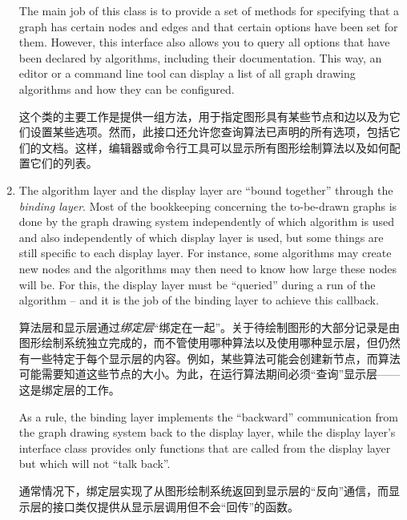 \begin{enumerate}
        The main job of this class is to provide a set of methods for
        specifying that a graph has certain nodes and edges and that certain
        options have been set for them. However, this interface also allows you
        to query all options that have been declared by algorithms, including
        their documentation. This way, an editor or a command line tool can
        display a list of all graph drawing algorithms and how they can be
        configured.


        这个类的主要工作是提供一组方法，用于指定图形具有某些节点和边以及为它们设置某些选项。然而，此接口还允许您查询算法已声明的所有选项，包括它们的文档。这样，编辑器或命令行工具可以显示所有图形绘制算法以及如何配置它们的列表。




    \item The algorithm layer and the display layer are ``bound together''
        through the \emph{binding layer}. Most of the bookkeeping concerning
        the to-be-drawn graphs is done by the graph drawing system
        independently of which algorithm is used and also independently of
        which display layer is used, but some things are still specific to each
        display layer. For instance, some algorithms may create new nodes and
        the algorithms may then need to know how large these nodes will be. For
        this, the display layer must be ``queried'' during a run of the
        algorithm -- and it is the job of the binding layer to achieve this
        callback.

        算法层和显示层通过\emph{绑定层}“绑定在一起”。关于待绘制图形的大部分记录是由图形绘制系统独立完成的，而不管使用哪种算法以及使用哪种显示层，但仍然有一些特定于每个显示层的内容。例如，某些算法可能会创建新节点，而算法可能需要知道这些节点的大小。为此，在运行算法期间必须“查询”显示层——这是绑定层的工作。

 

        As a rule, the binding layer implements the ``backward'' communication
        from the graph drawing system back to the display layer, while the
        display layer's interface class provides only functions that are called
        from the display layer but which will not ``talk back''.

        通常情况下，绑定层实现了从图形绘制系统返回到显示层的“反向”通信，而显示层的接口类仅提供从显示层调用但不会“回传”的函数。


\end{enumerate}

